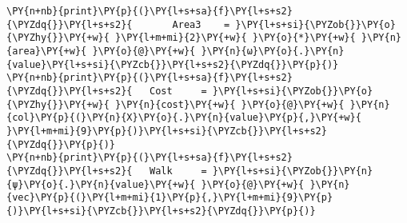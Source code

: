 \begin{tcolorbox}[breakable, size=fbox, boxrule=1pt, pad at break*=1mm,colback=cellbackground, colframe=cellborder]
\begin{Verbatim}[commandchars=\\\{\}]
\PY{n+nb}{print}\PY{p}{(}\PY{l+s+sa}{f}\PY{l+s+s2}{\PYZdq{}}\PY{l+s+s2}{       Area3    = }\PY{l+s+si}{\PYZob{}}\PY{o}{\PYZhy{}}\PY{+w}{ }\PY{l+m+mi}{2}\PY{+w}{ }\PY{o}{*}\PY{+w}{ }\PY{n}{area}\PY{+w}{ }\PY{o}{@}\PY{+w}{ }\PY{n}{ω}\PY{o}{.}\PY{n}{value}\PY{l+s+si}{\PYZcb{}}\PY{l+s+s2}{\PYZdq{}}\PY{p}{)}
\PY{n+nb}{print}\PY{p}{(}\PY{l+s+sa}{f}\PY{l+s+s2}{\PYZdq{}}\PY{l+s+s2}{   Cost     = }\PY{l+s+si}{\PYZob{}}\PY{o}{\PYZhy{}}\PY{+w}{ }\PY{n}{cost}\PY{+w}{ }\PY{o}{@}\PY{+w}{ }\PY{n}{col}\PY{p}{(}\PY{n}{X}\PY{o}{.}\PY{n}{value}\PY{p}{,}\PY{+w}{ }\PY{l+m+mi}{9}\PY{p}{)}\PY{l+s+si}{\PYZcb{}}\PY{l+s+s2}{\PYZdq{}}\PY{p}{)}
\PY{n+nb}{print}\PY{p}{(}\PY{l+s+sa}{f}\PY{l+s+s2}{\PYZdq{}}\PY{l+s+s2}{   Walk     = }\PY{l+s+si}{\PYZob{}}\PY{n}{ψ}\PY{o}{.}\PY{n}{value}\PY{+w}{ }\PY{o}{@}\PY{+w}{ }\PY{n}{vec}\PY{p}{(}\PY{l+m+mi}{1}\PY{p}{,}\PY{l+m+mi}{9}\PY{p}{)}\PY{l+s+si}{\PYZcb{}}\PY{l+s+s2}{\PYZdq{}}\PY{p}{)}


\end{Verbatim}
\end{tcolorbox}
